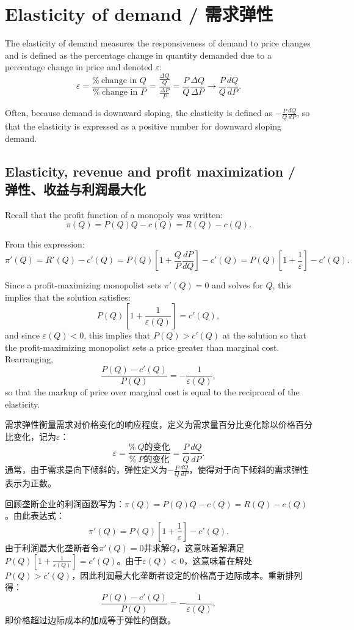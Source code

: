 \section{Elasticity of demand / 需求弹性}

\begin{original}
The elasticity of demand measures the responsiveness of demand to price changes and is defined as the percentage change in quantity demanded due to a percentage change in price and denoted $\varepsilon$:
\[
\varepsilon = \frac{\%\ \text{change in } Q}{\%\ \text{change in } P} = \frac{\frac{\Delta Q}{Q}}{\frac{\Delta P}{P}} = \frac{P}{Q} \frac{\Delta Q}{\Delta P} \to \frac{P}{Q} \frac{dQ}{dP}.
\]

Often, because demand is downward sloping, the elasticity is defined as $-\frac{P}{Q}\frac{dQ}{dP}$, so that the elasticity is expressed as a positive number for downward sloping demand.

\subsection{Elasticity, revenue and profit maximization / 弹性、收益与利润最大化}

Recall that the profit function of a monopoly was written:
\[
\pi(Q) = P(Q)Q - c(Q) = R(Q) - c(Q).
\]

From this expression:
\[
\pi'(Q) = R'(Q) - c'(Q) = P(Q)\left[1 + \frac{Q}{P}\frac{dP}{dQ}\right] - c'(Q) = P(Q)\left[1 + \frac{1}{\varepsilon}\right] - c'(Q).
\]

Since a profit-maximizing monopolist sets $\pi'(Q) = 0$ and solves for $Q$, this implies that the solution satisfies:
\[
P(Q)\left[1 + \frac{1}{\varepsilon(Q)}\right] = c'(Q),
\]
and since $\varepsilon(Q) < 0$, this implies that $P(Q) > c'(Q)$ at the solution so that the profit-maximizing monopolist sets a price greater than marginal cost. Rearranging,
\[
\frac{P(Q) - c'(Q)}{P(Q)} = -\frac{1}{\varepsilon(Q)},
\]
so that the markup of price over marginal cost is equal to the reciprocal of the elasticity.
\end{original}
\begin{translation}
需求弹性衡量需求对价格变化的响应程度，定义为需求量百分比变化除以价格百分比变化，记为$\varepsilon$：
\[
\varepsilon = \frac{\%\ \text{$Q$的变化}}{\%\ \text{$P$的变化}} = \frac{P}{Q} \frac{dQ}{dP}.
\]
通常，由于需求是向下倾斜的，弹性定义为$-\frac{P}{Q}\frac{dQ}{dP}$，使得对于向下倾斜的需求弹性表示为正数。

回顾垄断企业的利润函数写为：$\pi(Q) = P(Q)Q - c(Q) = R(Q) - c(Q)$。由此表达式：
\[
\pi'(Q) = P(Q)\left[1 + \frac{1}{\varepsilon}\right] - c'(Q).
\]
由于利润最大化垄断者令$\pi'(Q) = 0$并求解$Q$，这意味着解满足$P(Q)\left[1 + \frac{1}{\varepsilon(Q)}\right] = c'(Q)$。由于$\varepsilon(Q) < 0$，这意味着在解处$P(Q) > c'(Q)$，因此利润最大化垄断者设定的价格高于边际成本。重新排列得：
\[
\frac{P(Q) - c'(Q)}{P(Q)} = -\frac{1}{\varepsilon(Q)},
\]
即价格超过边际成本的加成等于弹性的倒数。
\end{translation}

